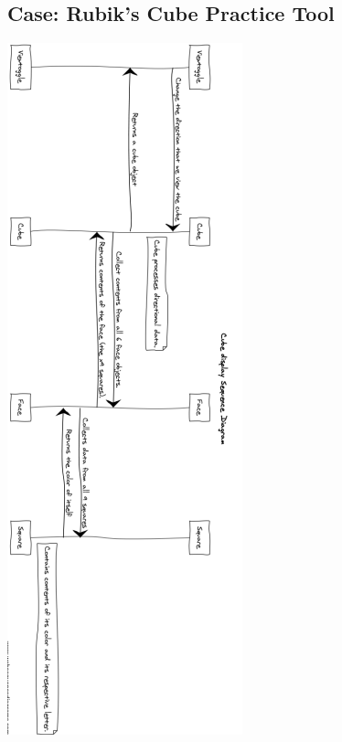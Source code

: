 \documentclass[12pt]{article}
\begin{document}
	\subsection{Case: Rubik's Cube Practice Tool}
	\includegraphics[width = .5\textwidth]{sequence.PNG}
\end{document}
